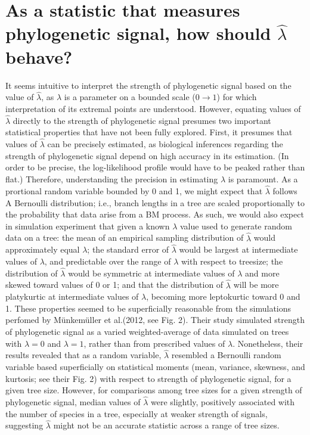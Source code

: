 \documentclass[
]{article}
\begin{document}
\hypertarget{as-a-statistic-that-measures-phylogenetic-signal-how-should-hatlambda-behave}{%
\section{\texorpdfstring{As a statistic that measures phylogenetic
signal, how should \(\hat{\lambda}\)
behave?}{As a statistic that measures phylogenetic signal, how should \textbackslash hat\{\textbackslash lambda\} behave?}}\label{as-a-statistic-that-measures-phylogenetic-signal-how-should-hatlambda-behave}}

It seems intuitive to interpret the strength of phylogenetic signal
based on the value of \(\hat{\lambda}\), as \(\lambda\) is a parameter
on a bounded scale (\(0\to1\)) for which interpretation of its extremal
points are understood. However, equating values of \(\hat{\lambda}\)
directly to the strength of phylogenetic signal presumes two important
statistical properties that have not been fully explored. First, it
presumes that values of \(\hat{\lambda}\) can be precisely estimated, as
biological inferences regarding the strength of phylogenetic signal
depend on high accuracy in its estimation. (In order to be precise, the
log-likelihood profile would have to be peaked rather than flat.)
Therefore, understanding the precision in estimating \(\hat{\lambda}\)
is paramount. As a prortional random variable bounded by 0 and 1, we
might expect that \(\hat{\lambda}\) follows A Bernoulli distribution;
i.e., branch lengths in a tree are scaled proportionally to the
probability that data arise from a BM process. As such, we would also
expect in simulation experiment that given a known \(\lambda\) value
used to generate random data on a tree: the mean of an empirical
sampling distribution of \(\hat{\lambda}\) would approximately equal
\(\lambda\); the standard error of \(\hat{\lambda}\) would be largest at
intermediate values of \(\lambda\), and predictable over the range of
\(\lambda\) with respect to treesize; the distribution of
\(\hat{\lambda}\) would be symmetric at intermediate values of
\(\lambda\) and more skewed toward values of 0 or 1; and that the
distribution of \(\hat{\lambda}\) will be more platykurtic at
intermediate values of \(\lambda\), becoming more leptokurtic toward 0
and 1. These properties seemed to be superficially reasonable from the
simulations perfomed by Münkemüller et al.(2012, see Fig. 2). Their
study simulated strength of phylogenetic signal as a varied
weighted-average of data simulated on trees with \(\lambda=0\) and
\(\lambda=1\), rather than from prescribed values of \(\lambda\).
Nonetheless, their results revealed that as a random variable,
\(\hat{\lambda}\) resembled a Bernoulli random variable based
superficially on statistical moments (mean, variance, skewness, and
kurtosis; see their Fig. 2) with respect to strength of phylogenetic
signal, for a given tree size. However, for comparisons among tree sizes
for a given strength of phylogenetic signal, median values of
\(\hat{\lambda}\) were slightly, positively associated with the number
of species in a tree, especially at weaker strength of signals,
suggesting \(\hat{\lambda}\) might not be an accurate statistic across a
range of tree sizes. \hfill\break
\end{document}
